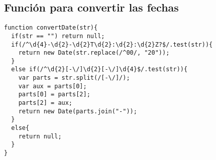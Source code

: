 \subsection{Función para convertir las fechas}

\begin{lstlisting}
function convertDate(str){
  if(str == "") return null;
  if(/^\d{4}-\d{2}-\d{2}T\d{2}:\d{2}:\d{2}Z?$/.test(str)){
    return new Date(str.replace(/^00/, "20"));
  }
  else if(/^\d{2}[-\/]\d{2}[-\/]\d{4}$/.test(str)){
    var parts = str.split(/[-\/]/);
    var aux = parts[0];
    parts[0] = parts[2];
    parts[2] = aux;
    return new Date(parts.join("-"));
  }
  else{
    return null;
  }
}
\end{lstlisting}



